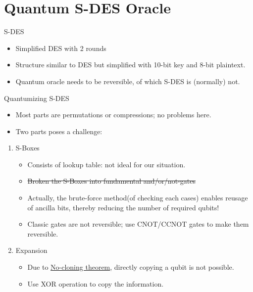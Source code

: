 \documentclass{beamer}
\begin{document}
	\section{Quantum S-DES Oracle}
	
	\begin{frame}{S-DES}
		\begin{itemize}
			\item Simplified DES with 2 rounds
			\item Structure similar to DES but simplified with 10-bit key and 8-bit plaintext.
			\item Quantum oracle needs to be reversible, of which S-DES is (normally) not.
		\end{itemize}
	\end{frame}
	
	\begin{frame}{Quantumizing S-DES}
		\begin{itemize}
			\item Most parts are permutations or compressions; no problems here.
			\item Two parts poses a challenge:
		\end{itemize}
		\begin{enumerate}
			\item S-Boxes
			\begin{itemize}
				\item Consists of lookup table: not ideal for our situation.
				\item \sout{Broken the S-Boxes into fundamental and/or/not-gates}
				\item Actually, the brute-force method(of checking each cases) enables reusage of ancilla bits, thereby reducing the number of required qubits!
				\item Classic gates are not reversible; use CNOT/CCNOT gates to make them reversible.
				
			\end{itemize}
			\item Expansion
			\begin{itemize}
				\item Due to \href{https://en.wikipedia.org/wiki/No-cloning_theorem}{No-cloning theorem}, directly copying a qubit is not possible.
				\item Use XOR operation to copy the information.
			\end{itemize}
		\end{enumerate}
	\end{frame}
	
\end{document}
